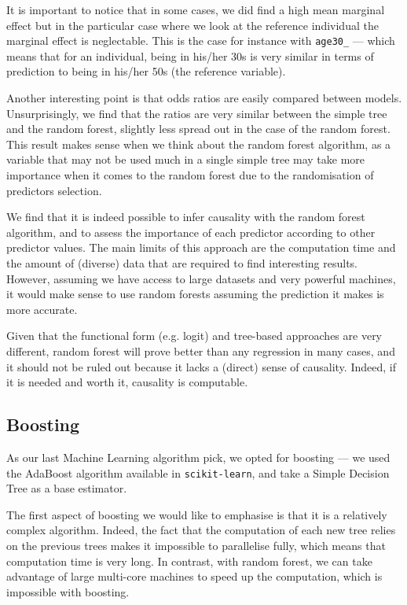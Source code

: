 It is important to notice that in some cases, we did find a high mean marginal effect but in the particular case where we look at the reference individual the marginal effect is neglectable. This is the case for instance with \texttt{age30\_} --- which means that for an individual, being in his/her 30s is very similar in terms of prediction to being in his/her 50s (the reference variable).

Another interesting point is that odds ratios are easily compared between models. Unsurprisingly, we find that the ratios are very similar between the simple tree and the random forest, slightly less spread out in the case of the random forest. This result makes sense when we think about the random forest algorithm, as a variable that may not be used much in a single simple tree may take more importance when it comes to the random forest due to the randomisation of predictors selection.

We find that it is indeed possible to infer causality with the random forest algorithm, and to assess the importance of each predictor according to other predictor values. The main limits of this approach are the computation time and the amount of (diverse) data that are required to find interesting results. However, assuming we have access to large datasets and very powerful machines, it would make sense to use random forests assuming the prediction it makes is more accurate.

Given that the functional form (e.g. logit) and tree-based approaches are very different, random forest will prove better than any regression in many cases, and it should not be ruled out because it lacks a (direct) sense of causality. Indeed, if it is needed and worth it, causality is computable.


\subsection{Boosting}
As our last Machine Learning algorithm pick, we opted for boosting --- we used the AdaBoost algorithm available in \texttt{scikit-learn}, and take a Simple Decision Tree as a base estimator.

The first aspect of boosting we would like to emphasise is that it is a relatively complex algorithm. Indeed, the fact that the computation of each new tree relies on the previous trees makes it impossible to parallelise fully, which means that computation time is very long. In contrast, with random forest, we can take advantage of large multi-core machines to speed up the computation, which is impossible with boosting.

